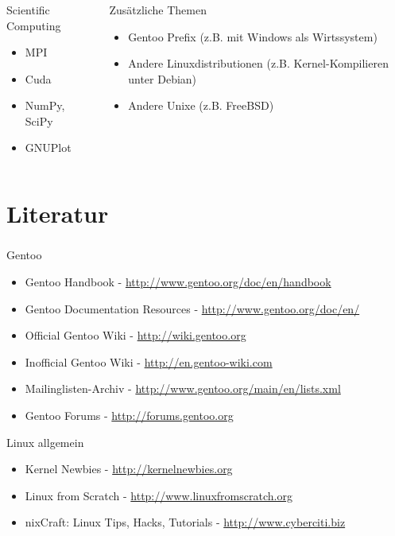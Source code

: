 \documentclass[utf8]{beamer}
\begin{document}
\begin{frame}
  \frametitle{\insertsectionhead}
  \framesubtitle{}

\begin{columns}
\begin{block}{Scientific Computing}
  \begin{itemize}
    \item MPI
    \item Cuda
    \item NumPy, SciPy
    \item GNUPlot
  \end{itemize}
\end{block}

\begin{block}{Zusätzliche Themen}
  \begin{itemize}
      \item Gentoo Prefix (z.B. mit Windows als Wirtssystem)
      \item Andere Linuxdistributionen (z.B. Kernel-Kompilieren unter Debian)
      \item Andere Unixe (z.B. FreeBSD)
  \end{itemize}
\end{block}
\end{columns}
\end{frame}

\section{Literatur}

\begin{frame}
  \frametitle{\insertsectionhead}
  \framesubtitle{}

  \begin{block}{Gentoo}
    \begin{itemize}
      \item Gentoo Handbook - \url{http://www.gentoo.org/doc/en/handbook}
      \item Gentoo Documentation Resources - \url{http://www.gentoo.org/doc/en/}
      \item Official Gentoo Wiki - \url{http://wiki.gentoo.org}
      \item Inofficial Gentoo Wiki - \url{http://en.gentoo-wiki.com}
      \item Mailinglisten-Archiv - \url{http://www.gentoo.org/main/en/lists.xml}
      \item Gentoo Forums - \url{http://forums.gentoo.org}
    \end{itemize}
  \end{block}
  \begin{block}{Linux allgemein}
    \begin{itemize}
      \item Kernel Newbies - \url{http://kernelnewbies.org}
      \item Linux from Scratch - \url{http://www.linuxfromscratch.org}
      \item nixCraft: Linux Tips, Hacks, Tutorials - \url{http://www.cyberciti.biz}
    \end{itemize}
  \end{block}
\end{frame}
\end{document}

